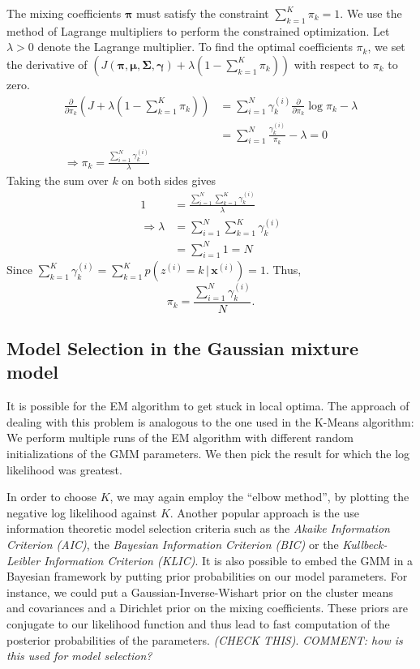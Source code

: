 \documentclass[final,3p,times,twocolumn]{elsarticle}
\begin{document}
The mixing coefficients $\boldsymbol \pi$ must satisfy the constraint $\sum_{k=1}^K \pi_k = 1$.
We use the method of Lagrange multipliers to perform the constrained optimization.
Let $\lambda > 0$ denote the Lagrange multiplier.
To find the optimal coefficients $\pi_k$, we set the derivative of $(J(\boldsymbol \pi, \boldsymbol \mu, \boldsymbol \Sigma, \boldsymbol \gamma) + \lambda(1-\sum_{k=1}^K \pi_k))$ with respect to $\pi_k$ to zero.
\begin{equation}
\label{eqn:gmmPi1}
\begin{split}
\frac{\partial}{\partial \pi_k}(J + \lambda(1 - \sum_{k=1}^K \pi_k)) &= \sum_{i=1}^N\gamma_k^{(i)} \frac{\partial}{\partial \pi_k} \log \pi_k - \lambda\\
&= \sum_{i=1}^N \frac{\gamma_k^{(i)}}{\pi_k} - \lambda = 0\\
\Rightarrow \pi_k = \frac{\sum_{i=1}^N\gamma_k^{(i)}}{\lambda}
\end{split}
\end{equation}
Taking the sum over $k$ on both sides gives
\begin{equation}
\label{eqn:gmmPi2}
\begin{split}
1 &= \frac{\sum_{i=1}^N \sum_{k=1}^K \gamma_k^{(i)}}{\lambda}\\
\Rightarrow \lambda &= \sum_{i=1}^N \sum_{k=1}^K \gamma_k^{(i)}\\
&= \sum_{i=1}^N 1 = N
\end{split}
\end{equation}
Since $\sum_{k=1}^K \gamma_k^{(i)} = \sum_{k=1}^K p(z^{(i)} = k\,|\,\boldsymbol x^{(i)}) = 1$.
Thus,
\begin{equation}
\pi_k = \frac{\sum_{i=1}^N \gamma_k^{(i)}}{N}.
\label{eqn:gmmPi3}
\end{equation}

\subsection{Model Selection in the Gaussian mixture model}
It is possible for the EM algorithm to get stuck in local optima.
The approach of dealing with this problem is analogous to the one used in the K-Means algorithm:
We perform multiple runs of the EM algorithm with different random initializations of the GMM parameters. We then pick the result for which the log likelihood was greatest.

In order to choose $K$, we may again employ the ``elbow method'', by plotting the negative log likelihood against $K$.
Another popular approach is the use information theoretic model selection criteria such as the \emph{Akaike Information Criterion (AIC)}, the \emph{Bayesian Information Criterion (BIC)} or the \emph{Kullbeck-Leibler Information Criterion (KLIC)}.
It is also possible to embed the GMM in a Bayesian framework by putting prior probabilities on our model parameters.
For instance, we could put a Gaussian-Inverse-Wishart prior on the cluster means and covariances and a Dirichlet prior on the mixing coefficients.
These priors are conjugate to our likelihood function and thus lead to fast computation of the posterior probabilities of the parameters. \emph{(CHECK THIS)}.
\emph{COMMENT: how is this used for model selection?}
\end{document}
